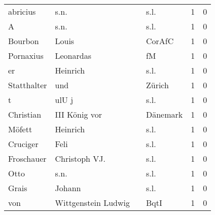 \begin{center}
\begin{tiny}
\begin{longtabu}{llllrr}
                 abricius &                               s.n. &             &                                        s.l. &          1 &         0 \\
                        A &                               s.n. &             &                                        s.l. &          1 &         0 \\
                  Bourbon &                              Louis &             &                                      CorAfC &          1 &         0 \\
                Pornaxius &                          Leonardas &             &                                          fM &          1 &         0 \\
                       er &                           Heinrich &             &                                        s.l. &          1 &         0 \\
              Statthalter &                                und &             &                                      Zürich &          1 &         0 \\
                        t &                              ulU j &             &                                        s.l. &          1 &         0 \\
                Christian &                      III König vor &             &                                    Dänemark &          1 &         0 \\
                   Möfett &                           Heinrich &             &                                        s.l. &          1 &         0 \\
                 Cruciger &                               Feli &             &                                        s.l. &          1 &         0 \\
               Froschauer &                      Christoph VJ. &             &                                        s.l. &          1 &         0 \\
                     Otto &                               s.n. &             &                                        s.l. &          1 &         0 \\
                    Grais &                             Johann &             &                                        s.l. &          1 &         0 \\
                      von &                Wittgenstein Ludwig &             &                                        BqtI &          1 &         0 \\

\end{longtabu}
\end{tiny}
\end{center}
